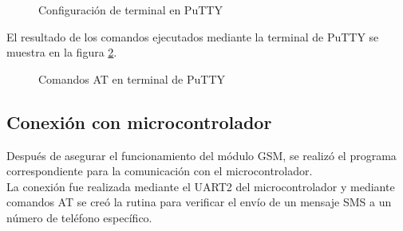 	\begin{figure}[htbp!]
		\centering
		\caption{Configuración de terminal en PuTTY}
		\label{fig:ConfiguracionPutty}
	\end{figure}
 
El resultado de los comandos ejecutados mediante la terminal de PuTTY se muestra en la figura \ref{fig:TerminalPutty}.

	\begin{figure}[htbp!]
		\centering
		\caption{Comandos AT en terminal de PuTTY}
		\label{fig:TerminalPutty}
	\end{figure}


\subsection{Conexión con microcontrolador}
Después de asegurar el funcionamiento del módulo GSM, se realizó el programa correspondiente para la comunicación con el microcontrolador.\\

La conexión fue realizada mediante el UART2 del microcontrolador y mediante comandos AT se creó la rutina para verificar el envío de un mensaje SMS a un número de teléfono específico.

